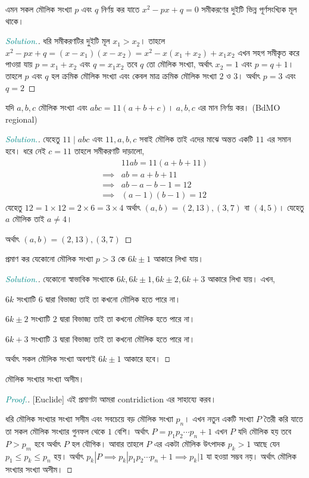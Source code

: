 \documentclass[a4paper,11pt]{article}
\newenvironment{sltn}{\begin{proof}[\emph{\textcolor{darkcyan}{Solution.}}]} {\end{proof}}
\newenvironment{prf}{\begin{proof}[\emph{\textcolor{darkcyan}{Proof.}}]} {\end{proof}}
\begin{document}
\begin{xmpl}
	এমন সকল মৌলিক সংখ্যা $p$ এবং $q$ নির্ণয় কর যাতে $x^2-px+q=0$ সমীকরণের দুইটি ভিন্ন পূর্ণসংখ্যিক মূল থাকে। 
\end{xmpl}
\begin{sltn}
	ধরি সমীকরণটির দুইটি মূল $x_1>x_2$। তাহলে $x^2-px+q=(x-x_1)(x-x_2)=x^2-x(x_1+x_2)+x_1x_2$ এখন সহগ সমীকৃত করে পাওয়া যায় $p=x_1+x_2$ এবং $q=x_1x_2$ তবে $q$ তো মৌলিক সংখ্যা, অর্থাৎ $x_2=1$ এবং $p=q+1$। তাহলে $p$ এবং $q$ হল ক্রমিক মৌলিক সংখ্যা এবং কেবল মাত্র ক্রমিক মৌলিক সংখ্যা $2$ ও $3$। অর্থাৎ $p=3$ এবং $q=2$
\end{sltn}
\begin{xmpl}
	যদি $a,b,c$ মৌলিক সংখ্যা এবং $abc=11(a+b+c)$। $a,b,c$ এর মান নির্ণয় কর। (BdMO regional)
\end{xmpl}
\begin{sltn}
	যেহেতু $11 \mid abc$ এবং $11,a,b,c$ সবাই মৌলিক তাই এদের মাঝে অন্তত একটি $11$ এর সমান হবে। ধরে নেই $c=11$ তাহলে সমীকরণটি দাড়ালো, 
	\begin{align*}
		         & 11ab= 11(a+b+11) \\
		\implies & ab=  a+b+11      \\
		\implies & ab-a-b-1= 12     \\
		\implies & (a-1)(b-1)= 12
	\end{align*}
	যেহেতু $12=1\times 12=2\times 6=3\times 4$ অর্থাৎ $(a,b)=(2,13),(3,7)$ বা $(4,5)$। যেহেতু $a$ মৌলিক তাই $a \neq 4$। 
	
	অর্থাৎ $(a,b)=(2,13),(3,7)$
\end{sltn}
\begin{xmpl}
	\label{prime-6k}
	প্রমাণ কর যেকোনো মৌলিক সংখ্যা $p>3$ কে $6k \pm 1$ আকারে লিখা যায়। 
\end{xmpl}
\begin{sltn}
	যেকোনো স্বাভাবিক সংখ্যাকে $6k,6k\pm 1, 6k \pm 2, 6k+3$ আকারে লিখা যায়। এখন, 
	
	$6k$ সংখ্যাটি $6$ দ্বারা বিভাজ্য তাই তা কখনো মৌলিক হতে পারে না। 
	
	$6k \pm 2$ সংখ্যাটি $2$ দ্বারা বিভাজ্য তাই তা কখনো মৌলিক হতে পারে না। 
	
	$6k+3$ সংখ্যাটি $3$ দ্বারা বিভাজ্য তাই তা কখনো মৌলিক হতে পারে না। 
	
	অর্থাৎ সকল মৌলিক সংখ্যা অবশ্যই $6k \pm 1$ আকারে হবে।  
\end{sltn}
\begin{thrm}
	মৌলিক সংখ্যার সংখ্যা অসীম। 
\end{thrm}
\begin{prf}[Euclide]
	এই প্রমাণটা আমরা contridiction এর সাহায্যে করব। 
	
	ধরি মৌলিক সংখ্যার সংখ্যা সসীম এবং সবচেয়ে বড় মৌলিক সংখ্যা $p_n$। এখন নতুন একটি সংখ্যা $P$ তৈরী করি যাতে তা সকল মৌলিক সংখ্যার গুনফল থেকে $1$ বেশি। অর্থাৎ $P=p_1p_2\cdots p_n+1$ এখন $P$ যদি মৌলিক হয় তবে $P>p_m$ হবে অর্থাৎ $P$ হল যৌগিক। আবার তাহলে $P$ এর একটা মৌলিক উৎপাদক $p_k>1$ আছে যেন $p_1 \leq p_k \leq p_n$ হয়। অর্থাৎ $p_k|P \implies p_k|p_1 p_2 \cdots p_n+1 \implies p_k|1$ যা হওয়া সম্ভব নয়। অর্থাৎ মৌলিক সংখ্যার সংখ্যা অসীম।  
\end{prf}
\end{document}
